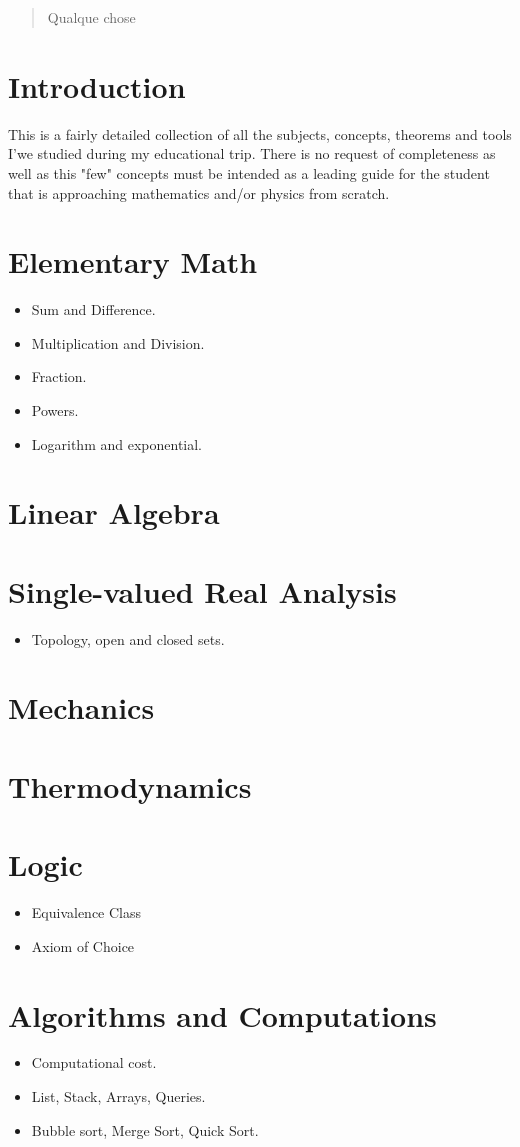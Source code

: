 \documentclass[10pt]{article}
\begin{document}
\begin{abstract}
	Qualque chose
\end{abstract}
\section*{Introduction}
This is a fairly detailed collection of all the subjects, concepts, theorems and tools I'we studied during my educational trip. There is no request of completeness as well as this "few" concepts must be intended as a leading guide for the student that is approaching mathematics and/or physics from scratch.
\section{Elementary Math}
\begin{itemize}
	\item Sum and Difference.
	\item Multiplication and Division.
	\item Fraction.
	\item Powers.
	\item Logarithm and exponential.
\end{itemize}
\section{Linear Algebra}
\section{Single-valued Real Analysis}
\begin{itemize}
	\item Topology, open and closed sets.
\end{itemize}
\section{Mechanics}
\section{Thermodynamics}
\section{Logic}
\begin{itemize}
\item Equivalence Class
\item Axiom of Choice
\end{itemize}
\section{Algorithms and Computations}
\begin{itemize}
	\item Computational cost.
	\item List, Stack, Arrays, Queries.
	\item Bubble sort, Merge Sort, Quick Sort.
\end{itemize}
\end{document}
